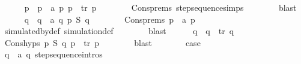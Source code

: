 \begin{isabellebody}
\ \ \ \ \isamarkupfalse%
\ p{\isacharprime}{\kern0pt}\ \ {\isacartoucheopen}p\ {\isasymmapsto}\ a\ p{\isacharprime}{\kern0pt}{\isacartoucheclose}\ {\isacartoucheopen}p{\isacharprime}{\kern0pt}\ {\isasymmapsto}{\isachardollar}{\kern0pt}\ tr\ p{\isacharprime}{\kern0pt}{\isacharprime}{\kern0pt}{\isacartoucheclose}\isanewline
\ \ \ \ \ \ \isamarkupfalse%
\ Cons{\isachardot}{\kern0pt}prems{\isacharparenleft}{\kern0pt}{}{\isacharparenright}{\kern0pt}\ step{\isacharunderscore}{\kern0pt}sequence{\isachardot}{\kern0pt}simps\isanewline
\ \ \ \ \ \ \isamarkupfalse%
\ blast\isanewline
\ \ \ \ \isamarkupfalse%
\ q{\isacharprime}{\kern0pt}\ \ {\isacartoucheopen}q\ {\isasymmapsto}\ a\ q{\isacharprime}{\kern0pt}{\isacartoucheclose}\ {\isacartoucheopen}p{\isacharprime}{\kern0pt}\ {\isasymlesssim}S\ q{\isacharprime}{\kern0pt}{\isacartoucheclose}\isanewline
\ \ \ \ \ \ \isamarkupfalse%
\ Cons{\isachardot}{\kern0pt}prems{\isacharparenleft}{\kern0pt}{}{\isacharparenright}{\kern0pt}\ {\isacartoucheopen}p\ {\isasymmapsto}\ a\ p{\isacharprime}{\kern0pt}{\isacartoucheclose}\ \isamarkupfalse%
\ simulated{\isacharunderscore}{\kern0pt}by{\isacharunderscore}{\kern0pt}def\ simulation{\isacharunderscore}{\kern0pt}def\isanewline
\ \ \ \ \ \ \isamarkupfalse%
\ blast\isanewline
\ \ \ \ \isamarkupfalse%
\ q{\isacharprime}{\kern0pt}{\isacharprime}{\kern0pt}\ \ {\isacartoucheopen}q{\isacharprime}{\kern0pt}\ {\isasymmapsto}{\isachardollar}{\kern0pt}\ tr\ q{\isacharprime}{\kern0pt}{\isacharprime}{\kern0pt}{\isacartoucheclose}\isanewline
\ \ \ \ \ \ \isamarkupfalse%
\ Cons{\isachardot}{\kern0pt}hyps\ {\isacartoucheopen}p{\isacharprime}{\kern0pt}\ {\isasymlesssim}S\ q{\isacharprime}{\kern0pt}{\isacartoucheclose}\ {\isacartoucheopen}p{\isacharprime}{\kern0pt}\ {\isasymmapsto}{\isachardollar}{\kern0pt}\ tr\ p{\isacharprime}{\kern0pt}{\isacharprime}{\kern0pt}{\isacartoucheclose}\isanewline
\ \ \ \ \ \ \isamarkupfalse%
\ blast\isanewline
\ \ \ \ \isamarkupfalse%
\ \isamarkupfalse%
\ {\isacharquery}{\kern0pt}case\isanewline
\ \ \ \ \ \ \isamarkupfalse%
\ {\isacartoucheopen}q\ {\isasymmapsto}\ a\ q{\isacharprime}{\kern0pt}{\isacartoucheclose}\ step{\isacharunderscore}{\kern0pt}sequence{\isachardot}{\kern0pt}intros{\isacharparenleft}{\kern0pt}{}{\isacharparenright}{\kern0pt}\isanewline
\ \ \ \ \ \ \isamarkupfalse%

\end{isabellebody}
